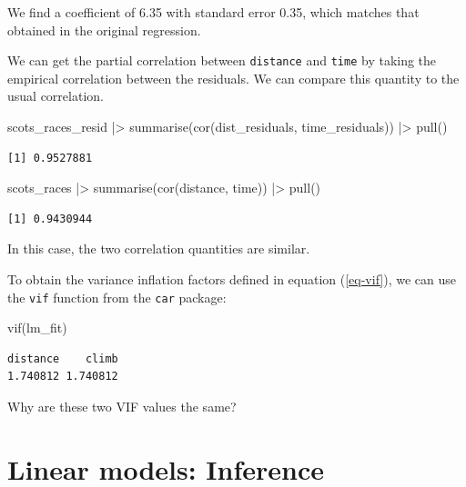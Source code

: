 \documentclass[
  11pt,
  letterpaper,
  oneside]{book}
\newenvironment{Shaded}{\begin{snugshade}}{\end{snugshade}}
\newcommand{\FunctionTok}[1]{\textcolor[rgb]{0.28,0.35,0.67}{#1}}
\newcommand{\NormalTok}[1]{\textcolor[rgb]{0.00,0.23,0.31}{#1}}
\newcommand{\SpecialCharTok}[1]{\textcolor[rgb]{0.37,0.37,0.37}{#1}}
\theoremstyle{plain}
\theoremstyle{plain}
\theoremstyle{definition}
\theoremstyle{definition}
\theoremstyle{plain}
\theoremstyle{remark}
\begin{document}
We find a coefficient of 6.35 with standard error 0.35, which matches
that obtained in the original regression.

We can get the partial correlation between \texttt{distance} and
\texttt{time} by taking the empirical correlation between the residuals.
We can compare this quantity to the usual correlation.

\begin{Shaded}
\begin{Highlighting}[]
\NormalTok{scots\_races\_resid }\SpecialCharTok{|\textgreater{}}
  \FunctionTok{summarise}\NormalTok{(}\FunctionTok{cor}\NormalTok{(dist\_residuals, time\_residuals)) }\SpecialCharTok{|\textgreater{}}
  \FunctionTok{pull}\NormalTok{()}
\end{Highlighting}
\end{Shaded}

\begin{verbatim}
[1] 0.9527881
\end{verbatim}

\begin{Shaded}
\begin{Highlighting}[]
\NormalTok{scots\_races }\SpecialCharTok{|\textgreater{}}
  \FunctionTok{summarise}\NormalTok{(}\FunctionTok{cor}\NormalTok{(distance, time)) }\SpecialCharTok{|\textgreater{}}
  \FunctionTok{pull}\NormalTok{()}
\end{Highlighting}
\end{Shaded}

\begin{verbatim}
[1] 0.9430944
\end{verbatim}

In this case, the two correlation quantities are similar.

To obtain the variance inflation factors defined in equation
(\ref{eq-vif}), we can use the \texttt{vif} function from the
\texttt{car} package:

\begin{Shaded}
\begin{Highlighting}[]
\FunctionTok{vif}\NormalTok{(lm\_fit)}
\end{Highlighting}
\end{Shaded}

\begin{verbatim}
distance    climb 
1.740812 1.740812 
\end{verbatim}

Why are these two VIF values the same?

\part{Linear models: Inference}
\end{document}
